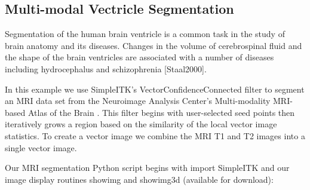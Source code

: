 \documentclass{frontiersMED} %
\begin{document}
\subsection{Multi-modal Vectricle Segmentation}
Segmentation of the human brain ventricle is a common task in the
study of brain anatomy and its diseases.  Changes in the volume of
cerebrospinal fluid and the shape of the brain ventricles are
associated with a number of diseases including hydrocephalus
\cite{Brandt1994} and schizophrenia [Staal2000]. 

In this example we use SimpleITK’s VectorConfidenceConnected filter
\cite{Ibanez2005} to segment an MRI data set from the Neuroimage Analysis
Center’s Multi-modality MRI-based Atlas of the Brain \cite{Halle2013}.
This filter begins with user-selected seed points then iteratively
grows a region based on the similarity of the local vector image
statistics.  To create a vector image we combine the MRI T1 and T2
images into a single vector image. 

Our MRI segmentation Python script begins with import SimpleITK and
our image display routines showimg and showimg3d (available for
download): 
\end{document}
